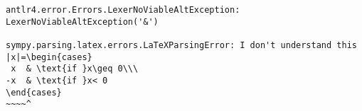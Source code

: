 \begin{verbatim}
antlr4.error.Errors.LexerNoViableAltException: LexerNoViableAltException('&')

sympy.parsing.latex.errors.LaTeXParsingError: I don't understand this
|x|=\begin{cases}
 x  & \text{if }x\geq 0\\\
-x  & \text{if }x< 0
\end{cases}
~~~~^
\end{verbatim}
